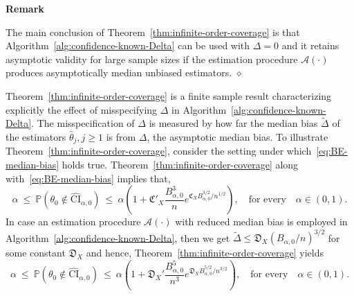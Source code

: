 \documentclass{article}
\newcounter{myalgctr}
\newenvironment{rem}{%
   \vskip1mm\indent%
   \refstepcounter{myalgctr}%
   \textbf{Remark \themyalgctr}%
   }{\hfill$\diamond$\par}  %
\numberwithin{myalgctr}{section}
\begin{document}
\begin{rem}
The main conclusion of Theorem~\ref{thm:infinite-order-coverage} is that Algorithm~\ref{alg:confidence-known-Delta} can be used with $\Delta = 0$ and it retains asymptotic validity for large sample sizes if  the estimation procedure $\mathcal{A}(\cdot)$ produces asymptotically median unbiased estimators. %
\end{rem}
Theorem~\ref{thm:infinite-order-coverage} is a finite sample result characterizing explicitly the effect of misspecifying $\Delta$ in Algorithm~\ref{alg:confidence-known-Delta}. The misspecification of $\Delta$ is measured by how far the median bias $\widetilde{\Delta}$ of the estimators $\widehat{\theta}_j, j\ge 1$ is from $\Delta$, the asymptotic median bias. 
To illustrate Theorem~\ref{thm:infinite-order-coverage}, consider the setting under which~\eqref{eq:BE-median-bias} holds true.
Theorem~\ref{thm:infinite-order-coverage} along with~\eqref{eq:BE-median-bias} implies that,
\begin{equation}\label{eq:conclusion-theorem-BE-bound}
\alpha ~\le~ \mathbb{P}(\theta_0 \notin \widehat{\mathrm{CI}}_{\alpha,0}) ~\le~ \alpha\left(1 + \mathfrak{C}'_X\frac{B_{\alpha,0}^3}{n}e^{\mathfrak{C}_XB_{\alpha,0}^{3/2}/n^{1/2}}\right),\quad\mbox{for every}\quad \alpha\in(0, 1).
\end{equation}
In case an estimation procedure $\mathcal{A}(\cdot)$ with reduced median bias is employed in Algorithm~\ref{alg:confidence-known-Delta}, then we get $\widetilde{\Delta} \le \mathfrak{D}_X(B_{\alpha,0}/n)^{3/2}$ for some constant $\mathfrak{D}_X$ and hence, Theorem~\ref{thm:infinite-order-coverage} yields
\begin{equation}\label{eq:conclusion-theorem-Edgeworth-expansion}
\alpha ~\le~ \mathbb{P}(\theta_0 \notin \widehat{\mathrm{CI}}_{\alpha,0}) ~\le~ \alpha\left(1 + \mathfrak{D}_X'\frac{B_{\alpha,0}^5}{n^3}e^{\mathfrak{D}_XB_{\alpha,0}^{5/2}/n^{3/2}}\right),\quad\mbox{for every}\quad \alpha\in(0, 1). 
\end{equation}
\end{document}
